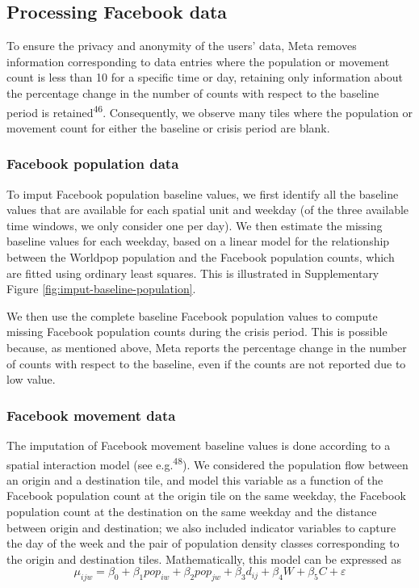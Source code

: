 \documentclass[
  11pt,
]{article}
\begin{document}
\subsection{Processing Facebook data}\label{processing-facebook-data}

To ensure the privacy and anonymity of the users' data, Meta removes
information corresponding to data entries where the population or
movement count is less than 10 for a specific time or day, retaining
only information about the percentage change in the number of counts
with respect to the baseline period is retained\textsuperscript{46}.
Consequently, we observe many tiles where the population or movement
count for either the baseline or crisis period are blank.

\subsubsection{Facebook population data}\label{facebook-population-data}

To imput Facebook population baseline values, we first identify all the
baseline values that are available for each spatial unit and weekday (of
the three available time windows, we only consider one per day). We then
estimate the missing baseline values for each weekday, based on a linear
model for the relationship between the Worldpop population and the
Facebook population counts, which are fitted using ordinary least
squares. This is illustrated in Supplementary Figure
\ref{fig:imput-baseline-population}.

We then use the complete baseline Facebook population values to compute
missing Facebook population counts during the crisis period. This is
possible because, as mentioned above, Meta reports the percentage change
in the number of counts with respect to the baseline, even if the counts
are not reported due to low value.

\subsubsection{Facebook movement data}\label{facebook-movement-data}

The imputation of Facebook movement baseline values is done according to
a spatial interaction model (see e.g.\textsuperscript{48}). We
considered the population flow between an origin and a destination tile,
and model this variable as a function of the Facebook population count
at the origin tile on the same weekday, the Facebook population count at
the destination on the same weekday and the distance between origin and
destination; we also included indicator variables to capture the day of
the week and the pair of population density classes corresponding to the
origin and destination tiles. Mathematically, this model can be
expressed as \begin{equation}
\mu_{ijw} = \beta_0 + \beta_1pop_{iw} +\beta_2pop_{jw} + \beta_3d_{ij} + \beta_4W + \beta_5C + \varepsilon
\end{equation}
\end{document}
